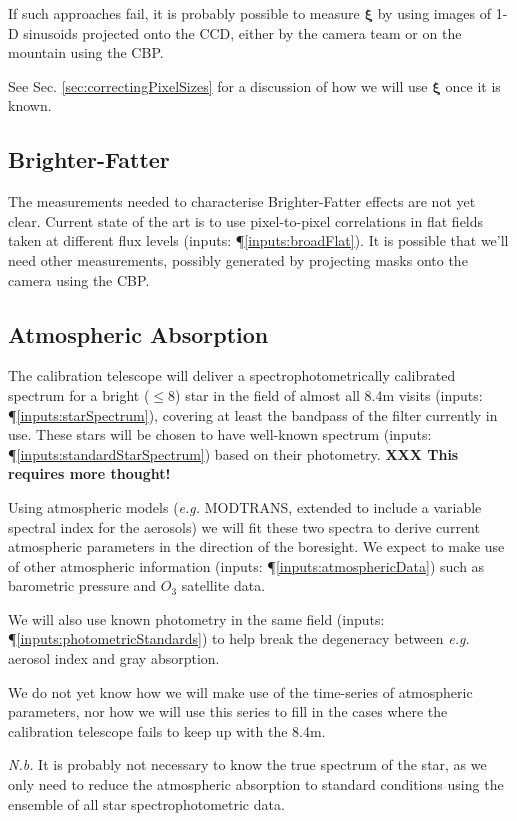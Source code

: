 \documentclass[12pt]{article}
\newcommand{\eg}{\textit{e.g.}\xspace}
\newcommand{\Nb}{\textit{N.b.}\xspace}
\newcommand{\xib}{{\boldsymbol \xi}}
\newcommand{\inputData}[1]{(inputs: \P \ref{inputs:#1})}
\newcommand{\XXX}[1]{\textbf{XXX #1}\xspace}
\newcommand{\secRef}[1]{Sec. \ref{sec:#1}}
\begin{document}
If such approaches fail, it is probably possible to measure $\xib$ by using images of 1-D sinusoids projected
onto the CCD, either by the camera team or on the mountain using the CBP.

See \secRef{correctingPixelSizes} for a discussion of how we will use $\xib$ once it is known.

\subsection{Brighter-Fatter}
\label{sec:brighterFatter}

The measurements needed to characterise Brighter-Fatter effects are not yet clear.  Current state of the art
is to use pixel-to-pixel correlations in flat fields taken at different flux levels \inputData{broadFlat}.  It
is possible that we'll need other measurements, possibly generated by projecting masks onto the camera using
the CBP.

\subsection{Atmospheric Absorption}

The calibration telescope will deliver a spectrophotometrically calibrated spectrum for a bright ($\le 8$)
star in the field of almost all 8.4m visits \inputData{starSpectrum}, covering at least the bandpass of the
filter currently in use.  These stars will be chosen to have well-known spectrum
\inputData{standardStarSpectrum} based on their photometry. \XXX{This requires more thought!}

Using atmospheric models (\eg MODTRANS, extended to include a variable spectral index for the aerosols)
we will fit these two spectra to derive current atmospheric parameters in the direction of the boresight.
We expect to make use of other atmospheric information \inputData{atmosphericData} such as barometric pressure
and $O_3$ satellite data.

We will also use known photometry in the same field \inputData{photometricStandards} to help break the
degeneracy between \eg aerosol index and gray absorption.

We do not yet know how we will make use of the time-series of atmospheric parameters, nor how we will
use this series to fill in the cases where the calibration telescope fails to keep up with the 8.4m.

\Nb It is probably not necessary to know the true spectrum of the star, as we only need to reduce the
atmospheric absorption to standard conditions using the ensemble of all star spectrophotometric data.
\end{document}
